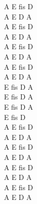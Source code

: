 \documentclass[a5paper, 10pt]{book}
\begin{document}
\begin{minipage}[t]{0.3\textwidth}
  A E fis D\\
  A E D A\\
  A E fis D\\
  A E D A\\
  A E fis D\\
  A E D A\\
  A E fis D\\
  A E D A\\

  E fis D A\\
  E fis D A\\
  E fis D A\\
  E fis D\\

  A E fis D\\
  A E D A\\
  A E fis D\\
  A E D A\\
  A E fis D\\
  A E D A\\
  A E fis D\\
  A E D A\\
\end{minipage}

\newpage
\end{document}
